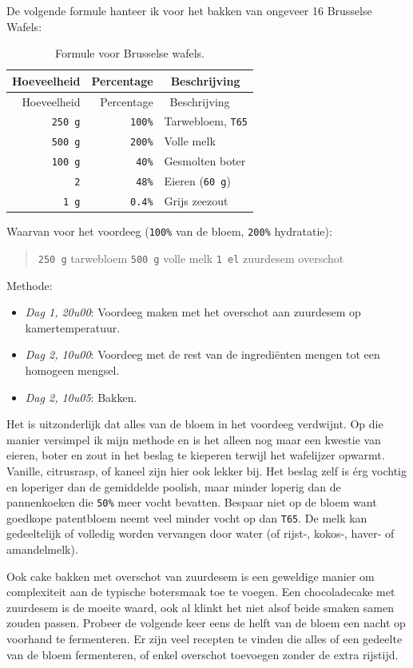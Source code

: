 \documentclass[
  11pt,
  dutch,
]{memoir}
\providecommand{\tightlist}{%
  \setlength{\itemsep}{0pt}\setlength{\parskip}{0pt}}
\begin{document}
De volgende formule hanteer ik voor het bakken van ongeveer 16 Brusselse
Wafels:

\begin{longtable}[]{@{}rrl@{}}
\caption{Formule voor Brusselse wafels.}\tabularnewline
\toprule
Hoeveelheid & Percentage & ~Beschrijving\tabularnewline
\midrule
\endfirsthead
\toprule
Hoeveelheid & Percentage & ~Beschrijving\tabularnewline
\midrule
\endhead
\texttt{250\ g} & \texttt{100\%} & Tarwebloem,
\texttt{T65}\tabularnewline
\texttt{500\ g} & \texttt{200\%} & Volle melk\tabularnewline
\texttt{100\ g} & \texttt{40\%} & Gesmolten boter\tabularnewline
\texttt{2} & \texttt{48\%} & Eieren (\texttt{60\ g})\tabularnewline
\texttt{1\ g} & \texttt{0.4\%} & Grijs zeezout\tabularnewline
\bottomrule
\end{longtable}

Waarvan voor het voordeeg (\texttt{100\%} van de bloem, \texttt{200\%}
hydratatie):

\begin{quote}
\texttt{250\ g} tarwebloem \newline \texttt{500\ g} volle melk \newline
\texttt{1\ el} zuurdesem overschot
\end{quote}

Methode:

\begin{itemize}
\tightlist
\item
  \emph{Dag 1, 20u00}: Voordeeg maken met het overschot aan zuurdesem op
  kamertemperatuur.
\item
  \emph{Dag 2, 10u00}: Voordeeg met de rest van de ingrediënten mengen
  tot een homogeen mengsel.
\item
  \emph{Dag 2, 10u05}: Bakken.
\end{itemize}

Het is uitzonderlijk dat alles van de bloem in het voordeeg verdwijnt.
Op die manier versimpel ik mijn methode en is het alleen nog maar een
kwestie van eieren, boter en zout in het beslag te kieperen terwijl het
wafelijzer opwarmt. Vanille, citrusrasp, of kaneel zijn hier ook lekker
bij. Het beslag zelf is érg vochtig en loperiger dan de gemiddelde
poolish, maar minder loperig dan de pannenkoeken die \texttt{50\%} meer
vocht bevatten. Bespaar niet op de bloem want goedkope patentbloem neemt
veel minder vocht op dan \texttt{T65}. De melk kan gedeeltelijk of
volledig worden vervangen door water (of rijst-, kokos-, haver- of
amandelmelk).

Ook cake bakken met overschot van zuurdesem is een geweldige manier om
complexiteit aan de typische botersmaak toe te voegen. Een chocoladecake
met zuurdesem is de moeite waard, ook al klinkt het niet alsof beide
smaken samen zouden passen. Probeer de volgende keer eens de helft van
de bloem een nacht op voorhand te fermenteren. Er zijn veel recepten te
vinden die alles of een gedeelte van de bloem fermenteren, of enkel
overschot toevoegen zonder de extra rijstijd.
\end{document}
